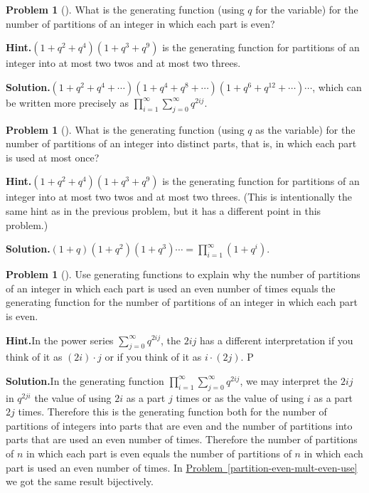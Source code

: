 \documentclass[10pt,]{book}
\theoremstyle{plain}
\theoremstyle{definition}
\newtheorem{activity}[project]{Problem}
\theoremstyle{definition}
\numberwithin{equation}{chapter}
\begin{document}
\begin{activity}[]\label{activity-205}
What is the generating function (using \(q\) for the variable) for the number of partitions of an integer in which each part is even?%
\par\medskip\noindent%
\textbf{Hint.}\quad \((1 + q^2 + q^4 )(1 + q^3 + q^9 )\) is the generating function for partitions of an integer into at most two twos and at most two threes.%
\par\medskip\noindent%
\textbf{Solution.}\quad \((1+q^2+q^4+\cdots)(1+q^4+q^8+\cdots)(1+q^6+q^{12}+\cdots)\cdots\), which can be written more precisely as \(\displaystyle\prod_{i=1}^\infty
\sum_{j=0}^\infty q^{2ij}\).%
\end{activity}
\begin{activity}[]\label{activity-206}
What is the generating function (using \(q\) as the variable) for the number of partitions of an integer into distinct parts, that is, in which each part is used at most once?%
\par\medskip\noindent%
\textbf{Hint.}\quad \((1 + q^2 + q^4 )(1 + q^3 + q^9 )\) is the generating function for partitions of an integer into at most two twos and at most two threes. (This is intentionally the same hint as in the previous problem, but it has a different point in this problem.)%
\par\medskip\noindent%
\textbf{Solution.}\quad \(\displaystyle (1+q)(1+q^2)(1+q^3)\cdots=
\prod_{i=1}^\infty(1+q^i)\).%
\end{activity}
\begin{activity}[]\label{activity-207}
Use generating functions to explain why the number of partitions of an integer in which each part is used an even number of times equals the generating function for the number of partitions of an integer in which each part is even.%
\par\medskip\noindent%
\textbf{Hint.}\quad In the power series \(\sum_{j=0}^\infty q^{2ij}\), the \(2ij\) has a different interpretation if you think of it as \((2i) \cdot j\) or if you think of it as \(i \cdot (2j)\). P%
\par\medskip\noindent%
\textbf{Solution.}\quad In the generating function \(\displaystyle\prod_{i=1}^\infty \sum_{j=0}^\infty q^{2ij}\), we may interpret the \(2ij\) in \(q^{2ji}\) the value of using \(2i\) as a part \(j\) times or as the value of using \(i\) as a part \(2j\) times. Therefore this is the generating function both for the number of partitions of integers into parts that are even and the number of partitions into parts that are used an even number of times. Therefore the number of partitions of \(n\) in which each part is even equals the number of partitions of \(n\) in which each part is used an even number of times. In \hyperref[partition-even-mult-even-use]{Problem~\ref{partition-even-mult-even-use}} we got the same result bijectively.%
\end{activity}
\end{document}
